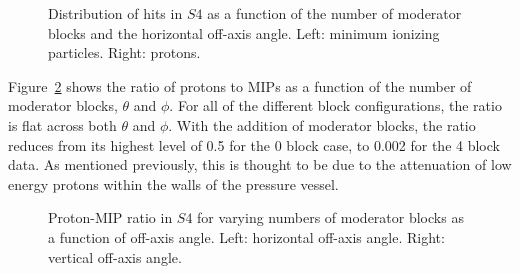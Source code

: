\begin{figure}[!ht]
  \begin{minipage}[t]{0.48\textwidth}
    \begin{adjustbox}{max totalsize={\textwidth}{.35\textheight},center}
      
    \end{adjustbox}
    
  \end{minipage}
  \hspace{0.3cm}
  \begin{minipage}[t]{0.48\textwidth}
    \begin{adjustbox}{max totalsize={\textwidth}{.35\textheight},center}
      
    \end{adjustbox}
  \end{minipage} 
  \caption{\label{fig:thetas4mip}Distribution of hits in $\mathit{S4}$ as a function of the number of moderator blocks and the horizontal off-axis angle. Left: minimum ionizing particles. Right: protons.}
\end{figure}	

Figure~\ref{fig:propiratio_s4_horz} shows the ratio of protons to MIPs as a function of the number of moderator blocks, $\theta$ and $\phi$.
For all of the different block configurations, the ratio is flat across both $\theta$ and $\phi$.
With the addition of moderator blocks, the ratio reduces from its highest level of 0.5 for the 0 block case, to 0.002 for the 4 block data.
As mentioned previously, this is thought to be due to the attenuation of low energy protons within the walls of the pressure vessel.

\begin{figure}[!ht]
  \begin{minipage}[t]{0.48\textwidth}
    \begin{adjustbox}{max totalsize={\textwidth}{.35\textheight}, center}
      
    \end{adjustbox}
  \end{minipage}
  \hspace{0.3cm}
  \begin{minipage}[t]{0.48\textwidth}
    \begin{adjustbox}{max totalsize={\textwidth}{.35\textheight}, center}
      
    \end{adjustbox}
  \end{minipage}	
  \caption{\label{fig:propiratio_s4_horz}Proton-MIP ratio in $\mathit{S4}$ for varying numbers of moderator blocks as a function of off-axis angle. Left: horizontal off-axis angle. Right: vertical off-axis angle.}
\end{figure}

